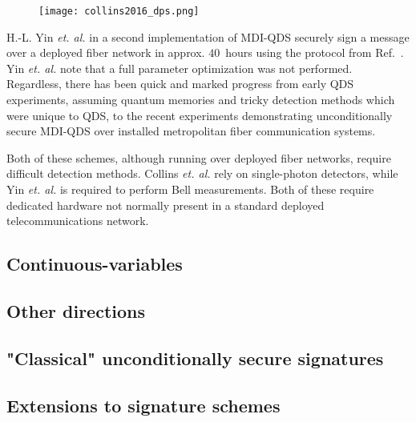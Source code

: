 \begin{figure}[htp]
\centering
\texttt{[image: collins2016\_dps.png]}
\caption{\label{fig:collins2016_dps}}
\end{figure}


H.-L. Yin \emph{et. al.} in a second implementation of MDI-QDS \cite{Yin2017} securely sign a message over a deployed fiber network in approx. $40$~hours using the protocol from Ref.~\cite{Puthoor2016}. Yin \emph{et. al.} note that a full parameter optimization was not performed. Regardless, there has been quick and marked progress from early QDS experiments, assuming quantum memories and tricky detection methods which were unique to QDS, to the recent experiments demonstrating unconditionally secure MDI-QDS over installed metropolitan fiber communication systems.

Both of these schemes, although running over deployed fiber networks, require difficult detection methods. Collins \emph{et. al.} \cite{Collings2016} rely on single-photon detectors, while Yin \emph{et. al.} \cite{Yin2017} is required to perform Bell measurements. Both of these require dedicated hardware not normally present in a standard deployed telecommunications network.









\subsection*{Continuous-variables}



\subsection*{Other directions}

\subsection{"Classical" unconditionally secure signatures}

\subsection{Extensions to signature schemes}